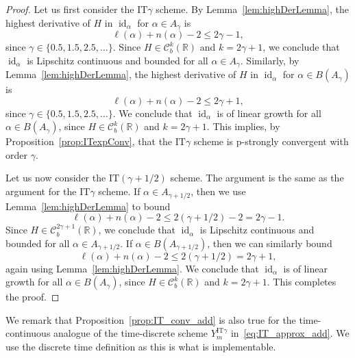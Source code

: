 \documentclass[11pt]{amsart}
\newcommand{\C}{\mathcal{C}}
\newcommand{\IT}{\textrm{IT}}
\newcommand{\id}{\operatorname{id}}
\begin{document}
{\begin{proof}
Let us first consider the $\IT \gamma$ scheme. By Lemma~\ref{lem:highDerLemma}, the highest derivative of $H$ in $\id_{\alpha}$ for $\alpha \in A_{\gamma}$ is
\begin{equation*}
\ell(\alpha) + n(\alpha)-2 \leq 2 \gamma - 1,
\end{equation*}
since $\gamma \in \{0.5,1.5,2.5,\ldots \}$. Since $H \in \C^{k}_{b}(\mathbb{R})$ and $k=2\gamma+1$, we conclude that $\id_{\alpha}$ is Lipschitz continuous and bounded for all $\alpha \in A_{\gamma}$. Similarly, by Lemma~\ref{lem:highDerLemma}, the highest derivative of $H$ in $\id_{\alpha}$ for $\alpha \in B(A_{\gamma})$ is
\begin{equation*}
\ell(\alpha) + n(\alpha) - 2 \leq 2 \gamma + 1,
\end{equation*}
since $\gamma \in \{ 0.5,1.5,2.5,\ldots \}$. We conclude that $\id_{\alpha}$ is of linear growth for all $\alpha \in B(A_{\gamma})$, since $H \in \C^{k}_{b}(\mathbb{R})$ and $k=2\gamma+1$. This implies, by Proposition~\ref{prop:ITexpConv}, that the $\IT \gamma$ scheme is p-strongly convergent with order $\gamma$.

Let us now consider the $\IT (\gamma+1/2)$ scheme. The argument is the same as the argument for the $\IT \gamma$ scheme. If $\alpha \in A_{\gamma + 1/2}$, then we use Lemma~\ref{lem:highDerLemma} to bound
\begin{equation*}
\ell(\alpha) + n(\alpha) - 2 \leq 2 (\gamma + 1/2) - 2 = 2 \gamma - 1.
\end{equation*}
Since $H \in \C^{2 \gamma + 1}_{b}(\mathbb{R})$, we conclude that $\id_{\alpha}$ is Lipschitz continuous and bounded for all $\alpha \in A_{\gamma + 1/2}$. If $\alpha \in B(A_{\gamma + 1/2})$, then we can similarly bound
\begin{equation*}
\ell(\alpha) + n(\alpha) - 2 \leq 2 (\gamma + 1/2) = 2 \gamma + 1,
\end{equation*}
again using Lemma~\ref{lem:highDerLemma}. We conclude that $\id_{\alpha}$ is of linear growth for all $\alpha \in B(A_{\gamma})$, since $H \in \C^{k}_{b}(\mathbb{R})$ and $k=2 \gamma + 1$. This completes the proof.
\end{proof}
We remark that Proposition~\ref{prop:IT_conv_add} is also true for the time-continuous analogue of the time-discrete scheme $Y^{\IT \gamma}_{m}$ in~\eqref{eq:IT_approx_add}. We use the discrete time definition as this is what is implementable.

}
\end{document}
